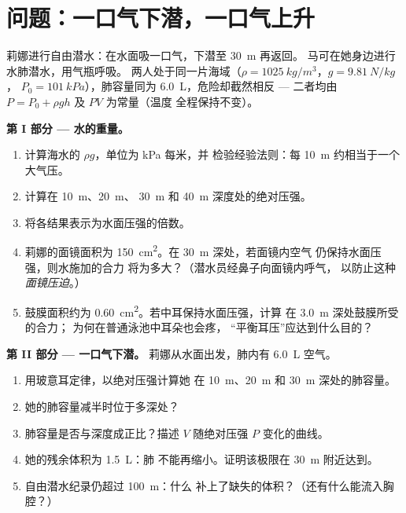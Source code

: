 \section{问题：一口气下潜，一口气上升}

\begin{problem}
\label{pb:g10:pressure:1}
莉娜进行自由潜水：在水面吸一口气，下潜至 \qty{30}{m} 再返回。
马可在她身边进行水肺潜水，用气瓶呼吸。
两人处于同一片海域（$\rho = \qty{1025}{kg/m^3}$，$g = \qty{9.81}{N/kg}$，
$P_0 = \qty{101}{kPa}$），肺容量同为 \qty{6.0}{L}，危险却截然相反 --- 
二者均由 $P = P_0 + \rho g h$ 及 $PV$ 为常量（温度
全程保持不变）。

\medskip
\noindent\textbf{第 I 部分 --- 水的重量。}
\begin{enumerate}
  \item 计算海水的 $\rho g$，单位为 \unit{kPa} 每米，并
        检验经验法则：每 \qty{10}{m} 约相当于一个大气压。
  \item 计算在 \qty{10}{m}、\qty{20}{m}、
        \qty{30}{m} 和 \qty{40}{m} 深度处的绝对压强。
  \item 将各结果表示为水面压强的倍数。
  \item 莉娜的面镜面积为 \qty{150}{cm^2}。在 \qty{30}{m} 深处，若面镜内空气
        仍保持水面压强，则水施加的合力
        将为多大？（潜水员经鼻子向面镜内呼气，
        以防止这种 \emph{面镜压迫}。）
  \item 鼓膜面积约为 \qty{0.60}{cm^2}。若中耳保持水面压强，计算
        在 \qty{3.0}{m} 深处鼓膜所受的合力；
        为何在普通泳池中耳朵也会疼，
        “平衡耳压”应达到什么目的？
\end{enumerate}

\medskip
\noindent\textbf{第 II 部分 --- 一口气下潜。}
莉娜从水面出发，肺内有 \qty{6.0}{L} 空气。
\begin{enumerate}[resume]
  \item 用玻意耳定律，以绝对压强计算她
        在 \qty{10}{m}、\qty{20}{m} 和 \qty{30}{m} 深处的肺容量。
  \item 她的肺容量减半时位于多深处？
  \item 肺容量是否与深度成正比？描述
        $V$ 随绝对压强 $P$ 变化的曲线。
  \item 她的残余体积为 \qty{1.5}{L}：肺
        不能再缩小。证明该极限在 \qty{30}{m} 附近达到。
  \item 自由潜水纪录仍超过 \qty{100}{m}：什么
        补上了缺失的体积？（还有什么能流入胸腔？）
\end{enumerate}


\end{problem}
